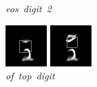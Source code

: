 \documentclass{article} %
\begin{document}
\begin{figure}[t]
  \caption{\mbox{\textit{eos digit 2}}}
\endminipage\hfill
{}
  \includegraphics[width=\linewidth]{figures/9-2-17.png}
  \caption{\mbox{\textit{of top digit}}}
\endminipage\hfill
{}
  \includegraphics[width=\linewidth]{figures/9-2-22.png}

\end{figure}
\end{document}
